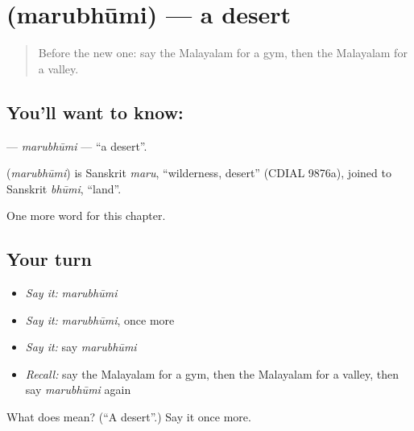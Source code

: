 \section[\texorpdfstring{\ml{മരുഭൂമി} (marubhūmi)}{മരുഭൂമി (marubhūmi)}]{ (marubhūmi) — a desert}

\label{lesson:ML-C279-marubhumi}



\begin{quote}
Before the new one: say the Malayalam for a gym, then the Malayalam for a valley.
\end{quote}

\subsection*{You'll want to know: }
\textbf{} — \emph{marubhūmi} — \textquotedblleft{}a desert\textquotedblright{}.

\begin{cousinweb}
\textbf{} (\emph{marubhūmi}) is Sanskrit \emph{maru}, \textquotedblleft{}wilderness, desert\textquotedblright{} (CDIAL 9876a), joined to Sanskrit \emph{bhūmi}, \textquotedblleft{}land\textquotedblright{}.
\end{cousinweb}

\begin{grammarlens}[title={What you've built}]
One more word for this chapter.
\end{grammarlens}

\subsection*{Your turn}
\begin{itemize}
\raggedright
  \item \emph{Say it:} \emph{marubhūmi}
  \item \emph{Say it:} \emph{marubhūmi}, once more
  \item \emph{Say it:} say \emph{marubhūmi}
  \item \emph{Recall:} say the Malayalam for a gym, then the Malayalam for a valley, then say \emph{marubhūmi} again
\end{itemize}

\begin{tcolorbox}[breakable,colback=teal!4,colframe=teal!35!black,title={Before you move on}]
What does  mean? (\textquotedblleft{}A desert\textquotedblright{}.) Say it once more.
\end{tcolorbox}

